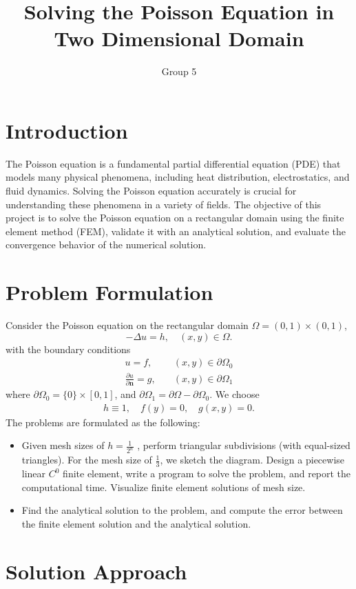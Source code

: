 \documentclass{article}
\title{Solving the Poisson Equation in Two Dimensional Domain}
\author{Group 5}
\begin{document}
\maketitle
\normalsize

\section{Introduction}
The Poisson equation is a fundamental partial differential equation (PDE) that models many physical phenomena, including heat distribution, electrostatics, and fluid dynamics. Solving the Poisson equation accurately is crucial for understanding these phenomena in a variety of fields. The objective of this project is to solve the Poisson equation on a rectangular domain using the finite element method (FEM), validate it with an analytical solution, and evaluate the convergence behavior of the numerical solution.

\section{Problem Formulation}
Consider the Poisson equation on the rectangular domain $\Omega=(0,1) \times (0,1)$,
$$
-\Delta u = h, \quad (x, y) \in \Omega.
$$
with the boundary conditions
\begin{align*}
    u = f,\quad& (x, y) \in \partial \Omega_0 \\
\frac{\partial u}{\partial \boldsymbol{n}} = g, \quad& (x, y) \in \partial \Omega_1
\end{align*}
where $\partial \Omega_0 = \{0\} \times [0,1]$, and $\partial \Omega_1 = \partial \Omega - \partial \Omega_0$.
We choose
\begin{align*}
    h \equiv 1, \quad f(y)=0,\quad g(x, y)=0.
\end{align*}
The problems are formulated as the following:
\begin{itemize}
    \item Given mesh sizes of $h=\frac{1}{2^n}$ , perform triangular subdivisions (with equal-sized triangles). For the mesh size of $\frac{1}{3}$, we sketch the diagram. Design a piecewise linear $C^0$ finite element, write a program to solve the problem, and report the computational time. Visualize finite element solutions of mesh size.
    \item Find the analytical solution to the problem, and compute the error between the finite element solution and the analytical solution.
\end{itemize}
\section{Solution Approach}
\end{document}

